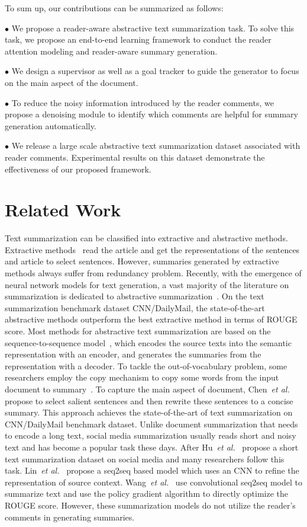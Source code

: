 \documentclass[letterpaper]{article} \usepackage{aaai19}  \usepackage{times}  \usepackage{helvet}  \usepackage{courier}
\newcommand{\etal}{\emph{et al.}\xspace}
\begin{document}
To sum up, our contributions can be summarized as follows: 

$\bullet$ We propose a reader-aware abstractive text summarization task. To solve this task, we propose an end-to-end learning framework to conduct the reader attention modeling and reader-aware summary generation.

$\bullet$ We design a supervisor as well as a goal tracker to guide the generator to focus on the main aspect of the document.

$\bullet$ To reduce the noisy information introduced by the reader comments, we propose a denoising module to identify which comments are helpful for summary generation automatically.

$\bullet$ We release a large scale abstractive text summarization dataset associated with reader comments.
Experimental results on this dataset demonstrate the effectiveness of our proposed framework.
    
\section{Related Work}
Text summarization can be classified into extractive and abstractive methods. 
Extractive methods~\cite{Jadhav2018ExtractiveSW,Narayan2018RankingSF} read the article and get the representations of the sentences and article to select sentences.
However, summaries generated by extractive methods always suffer from redundancy problem.
Recently, with the emergence of neural network models for text generation, a vast majority of the literature on summarization is dedicated to abstractive summarization~\cite{Bansal2018FastAS,Ma2018AutoencoderAA,Zhou2018SequentialCN}.
On the text summarization benchmark dataset CNN/DailyMail, the state-of-the-art abstractive methods outperform the best extractive method in terms of ROUGE score.
Most methods for abstractive text summarization are based on the sequence-to-sequence model~\cite{Sutskever2014SequenceTS}, which encodes the source texts into the semantic representation with an encoder, and generates the summaries from the representation with a decoder.
To tackle the out-of-vocabulary problem, some researchers employ the copy mechanism to copy some words from the input document to summary~\cite{Gu2016IncorporatingCM,see2017get}.
To capture the main aspect of document, Chen~\etal~ propose to select salient sentences and then rewrite these sentences to a concise summary.
This approach achieves the state-of-the-art of text summarization on CNN/DailyMail benchmark dataset.
Unlike document summarization that needs to encode a long text, social media summarization usually reads short and noisy text and has become a popular task these days.
After Hu~\etal~ propose a short text summarization dataset on social media and many researchers follow this task.
Lin~\etal~ propose a seq2seq based model which uses an CNN to refine the representation of source context.
Wang~\etal~ use convolutional seq2seq model to summarize text and use the policy gradient algorithm to directly optimize the ROUGE score.
However, these summarization models do not utilize the reader's comments in generating summaries.
\end{document}
